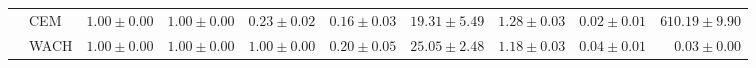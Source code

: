 \begin{table}[ht]
\begin{center}
\begin{sc}
\begin{scriptsize}
\begin{tabular}{l|l|rrrrrrrr}
 & CEM & $\boldsymbol{1.00\pm{0.00}}$ & $\boldsymbol{1.00\pm{0.00}}$ & $0.23\pm{0.02}$ & $0.16\pm{0.03}$ & $19.31\pm{5.49}$ & $1.28\pm{0.03}$ & $0.02\pm{0.01}$ & $610.19\pm{9.90}$ \\
 & WACH & $\boldsymbol{1.00\pm{0.00}}$ & $\boldsymbol{1.00\pm{0.00}}$ & $\boldsymbol{1.00\pm{0.00}}$ & $0.20\pm{0.05}$ & $25.05\pm{2.48}$ & $1.18\pm{0.03}$ & $0.04\pm{0.01}$ & $\boldsymbol{0.03\pm{0.00}}$ \\
\bottomrule
\end{tabular}
\end{scriptsize}
\end{sc}
\end{center}
\end{table}
